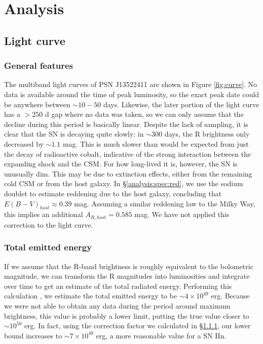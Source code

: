 \documentclass[a4paper,fleqn,usenatbib]{mnras}
\begin{document}
\section{Analysis} \label{analysis}
\subsection{Light curve} \label{analysis:curve}
\subsubsection{General features} \label{analysis:curve:gen}
The multiband light curves of PSN J13522411 are shown in Figure \ref{fig:curve}. No data is available around the time of peak luminosity, so the exact peak date could be anywhere between $\sim10-50$ days. Likewise, the later portion of the light curve has a $>250$ d gap where no data was taken, so we can only assume that the decline during this period is basically linear. Despite the lack of sampling, it is clear that the SN is decaying quite slowly: in $\sim300$ days, the R brightness only decreased by $\sim1.1$ mag. This is much slower than would be expected from just the decay of radioactive cobalt, indicative of the strong interaction between the expanding shock and the CSM. For how long-lived it is, however, the SN is unusually dim. This may be due to extinction effects, either from the remaining cold CSM or from the host galaxy. In \S \ref{analysis:spec:red}, we use the sodium doublet to estimate reddening due to the host galaxy, concluding that $E(B-V)_{host} \approx 0.39$ mag. Assuming a similar reddening law to the Milky Way, this implies an additional $A_{R,host} = 0.585$ mag. We have not applied this correction to the light curve.

\subsubsection{Total emitted energy} \label{analysis:curve:energy}
If we assume that the R-band brightness is roughly equivalent to the bolometric magnitude, we can transform the R magnitudes into luminosities and integrate over time to get an estimate of the total radiated energy. Performing this calculation \citep{Are99}, we estimate the total emitted energy to be $\sim4 \times 10^{49}$ erg. Because we were not able to obtain any data during the period around maximum brightness, this value is probably a lower limit, putting the true value closer to $\sim10^{50}$ erg. In fact, using the correction factor we calculated in \S \ref{analysis:curve:gen}, our lower bound increases to $\sim7 \times 10^{49}$ erg, a more reasonable value for a SN IIn.
\end{document}
